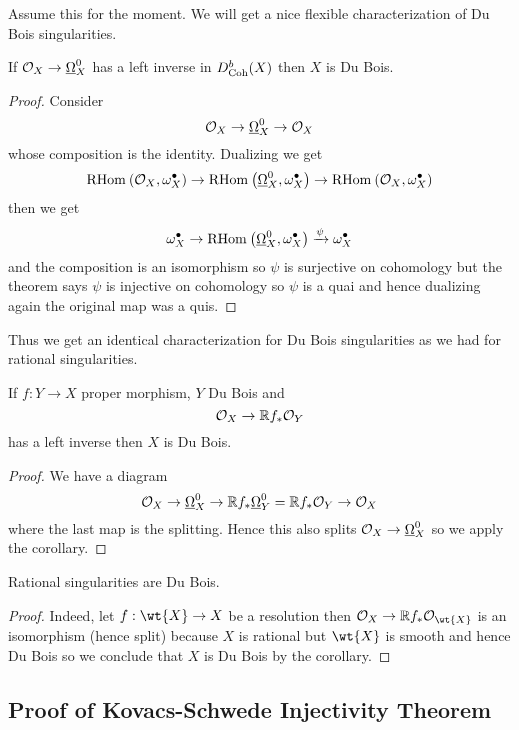 \documentclass[12pt]{article}
\begin{document}
Assume this for the moment. We will get a nice flexible characterization of Du Bois singularities. 

\begin{cor}
If $\mathcal{O}_{X} \to \underline{\Omega}_X^0$ has a left inverse in $D^b_{\mathrm{Coh}}(X)$ then $X$ is Du Bois.
\end{cor}

\begin{proof}
Consider
\[ \mathcal{O}_{X} \to \underline{\Omega}_X^0 \to \mathcal{O}_{X} \]
whose composition is the identity. Dualizing we get
\[ \mathrm{RHom}_{} \left( \mathcal{O}_{X}, \omega_X^\bullet \right) \to \mathrm{RHom}_{} \left( \underline{\Omega}_X^0, \omega_X^\bullet \right) \to \mathrm{RHom}_{} \left( \mathcal{O}_{X}, \omega_X^\bullet \right) \]
then we get
\[ \omega_X^\bullet \to \mathrm{RHom}_{} \left( \underline{\Omega}_X^0, \omega_X^\bullet \right) \xrightarrow{\psi} \omega_X^\bullet \]
and the composition is an isomorphism so $\psi$ is surjective on cohomology but the theorem says $\psi$ is injective on cohomology so $\psi$ is a quai and hence dualizing again the original map was a quis. 
\end{proof}

Thus we get an identical characterization for Du Bois singularities as we had for rational singularities. 

\begin{cor}
If $f : Y \to X$ proper morphism, $Y$ Du Bois and 
\[ \mathcal{O}_{X} \to \mathbb{R} f_* \mathcal{O}_{Y} \]
has a left inverse then $X$ is Du Bois.
\end{cor}

\begin{proof}
We have a diagram
\[ \mathcal{O}_{X} \to \underline{\Omega}_X^0 \to \mathbb{R} f_* \underline{\Omega}_Y^0 = \mathbb{R} f_* \mathcal{O}_{Y} \to \mathcal{O}_{X} \]
where the last map is the splitting. Hence this also splits $\mathcal{O}_{X} \to \underline{\Omega}_X^0$ so we apply the corollary.
\end{proof}

\begin{cor}
Rational singularities are Du Bois.
\end{cor}

\begin{proof}
Indeed, let $f : \wt{X} \to X$ be a resolution then $\struct{X} \to \RR f_* \struct{\wt{X}}$ is an isomorphism (hence split) because $X$ is rational but $\wt{X}$ is smooth and hence Du Bois so we conclude that $X$ is Du Bois by the corollary. 
\end{proof}

\subsection{Proof of Kovacs-Schwede Injectivity Theorem}
\end{document}
